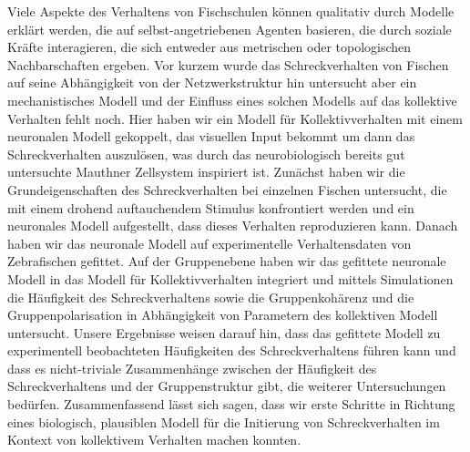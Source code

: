 Viele Aspekte des Verhaltens von Fischschulen k\"onnen qualitativ durch Modelle erkl\"art werden, die auf selbst-angetriebenen Agenten basieren, die durch soziale Kr\"afte interagieren, die sich entweder aus metrischen oder topologischen Nachbarschaften ergeben.
Vor kurzem wurde das Schreckverhalten von Fischen auf seine Abh\"angigkeit von der Netzwerkstruktur hin untersucht \citep{Rosenthal2015} aber ein mechanistisches Modell und der Einfluss eines solchen Modells auf das kollektive Verhalten fehlt noch.
Hier haben wir ein Modell f\"ur Kollektivverhalten mit einem neuronalen Modell gekoppelt, das visuellen Input bekommt um dann das Schreckverhalten auszul\"osen, was durch das neurobiologisch bereits gut untersuchte Mauthner Zellsystem inspiriert ist.
Zun\"achst haben wir die Grundeigenschaften des Schreckverhalten bei einzelnen Fischen untersucht, die mit einem drohend auftauchendem Stimulus konfrontiert werden und ein neuronales Modell aufgestellt, dass dieses Verhalten reproduzieren kann.
Danach haben wir das neuronale Modell auf experimentelle Verhaltensdaten von Zebrafischen gefittet.
Auf der Gruppenebene haben wir das gefittete neuronale Modell in das Modell f\"ur Kollektivverhalten integriert und mittels Simulationen die H\"aufigkeit des Schreckverhaltens sowie die Gruppenkoh\"arenz und die Gruppenpolarisation in Abh\"angigkeit von Parametern des kollektiven Modell untersucht.
Unsere Ergebnisse weisen darauf hin, dass das gefittete Modell zu experimentell beobachteten H\"aufigkeiten des Schreckverhaltens f\"uhren kann und dass es nicht-triviale Zusammenh\"ange zwischen der H\"aufigkeit des Schreckverhaltens und der Gruppenstruktur gibt, die weiterer Untersuchungen bed\"urfen.
Zusammenfassend l\"asst sich sagen, dass wir erste Schritte in Richtung eines biologisch, plausiblen Modell f\"ur die Initierung von Schreckverhalten im Kontext von kollektivem Verhalten machen konnten.